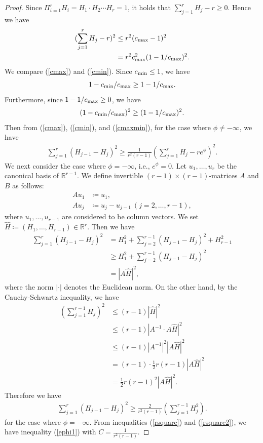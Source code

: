 \documentclass[12pt]{article}
\theoremstyle{definition}
\def\max{{\rm max}}
\def\min{{\rm min}}
\def\R{{\mathbb R}}
\begin{document}
\begin{proof}
Since $\Pi_{i=1}^rH_i=H_1\cdot H_2\cdots H_r=1$, it holds that $\sum_{j=1}^rH_j-r\geq 0$. Hence we have
\begin{align}
(\sum_{j=1}^rH_j-r)^2&\leq r^2(c_\max-1)^2 \notag \\
&=r^2c_\max^2(1-1/c_\max)^2 \label{cmin}.
\end{align}
We compare (\ref{cmax}) and (\ref{cmin}). Since $c_\min\leq 1$, we have
\begin{align*}
1-c_\min/c_\max\geq 1-1/c_\max.
\end{align*}
Furthermore, since $1-1/c_\max\geq 0$, we have
\begin{align}
(1-c_\min/c_\max)^2\geq (1-1/c_\max)^2. \label{cmaxmin}
\end{align}
Then from (\ref{cmax}), (\ref{cmin}), and (\ref{cmaxmin}), for the case where $\phi\neq -\infty$, we have
\begin{align}
\sum_{j=1}^r(H_{j-1}-H_j)^2\geq \frac{1}{r^2(r-1)}(\sum_{j=1}^rH_j-re^\phi)^2. \label{rsquare}
\end{align}
We next consider the case where $\phi=-\infty$, i.e., $e^\phi=0$. Let $u_1,\dots, u_r$ be the canonical basis of $\R^{r-1}$. We define invertible $(r-1)\times (r-1)$-matrices $A$ and $B$ as follows:
\begin{align*}
A u_1&\coloneqq u_1, \\
A u_j&\coloneqq u_j-u_{j-1} \ (j=2,\dots, r-1), 
\end{align*}
where $u_1,\dots, u_{r-1}$ are considered to be column vectors. We set $\hat{H}\coloneqq (H_1,\dots, H_{r-1})\in\R^{r}$. Then we have
\begin{align*}
\sum_{j=1}^r(H_{j-1}-H_j)^2&=H_1^2+\sum_{j=2}^{r-1}(H_{j-1}-H_j)^2+H_{r-1}^2 \\
&\geq H_1^2+\sum_{j=2}^{r-1}(H_{j-1}-H_j)^2 \\
&=|A\hat{H}|^2,
\end{align*}
where the norm $|\cdot|$ denotes the Euclidean norm. On the other hand, by the Cauchy-Schwartz inequality, we have
\begin{align*}
(\sum_{j=1}^{r-1}H_j)^2&\leq (r-1)|\hat{H}|^2 \\
&\leq (r-1)|A^{-1}\cdot A\hat{H}|^2 \\
&\leq (r-1)|A^{-1}|^2|A\hat{H}|^2 \\
&=(r-1)\cdot \frac{1}{2}r(r-1) |A\hat{H}|^2\\
&=\frac{1}{2}r(r-1)^2|A\hat{H}|^2.
\end{align*}
Therefore we have
\begin{align}
\sum_{j=1}^r(H_{j-1}-H_j)^2\geq \frac{2}{r^2(r-1)}(\sum_{j=1}^{r-1}H_j^2). \label{rsquare2}
\end{align}
for the case where $\phi=-\infty$. From inequalities (\ref{rsquare}) and (\ref{rsquare2}), we have inequality (\ref{ephi1}) with $C=\frac{1}{r^2(r-1)}$.
\end{proof}
\end{document}
